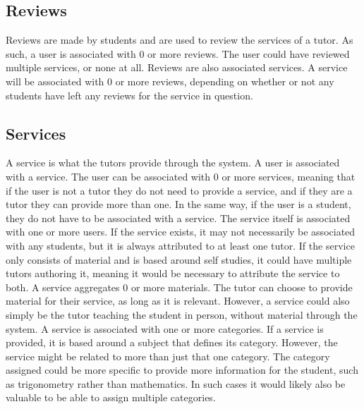 \subsection{Reviews}
Reviews are made by students and are used to review the services of a tutor.
As such, a user is associated with 0 or more reviews.
The user could have reviewed multiple services, or none at all.
Reviews are also associated services.
A service will be associated with 0 or more reviews, depending on whether or not any students have left any reviews for the service in question.

\subsection{Services}
A service is what the tutors provide through the system. 
A user is associated with a service.
The user can be associated with 0 or more services, meaning that if the user is not a tutor they do not need to provide a service, and if they are a tutor they can provide more than one. 
In the same way, if the user is a student, they do not have to be associated with a service.
The service itself is associated with one or more users.
If the service exists, it may not necessarily be associated with any students, but it is always attributed to at least one tutor.
If the service only consists of material and is based around self studies, it could have multiple tutors authoring it, meaning it would be necessary to attribute the service to both.
A service aggregates 0 or more materials. 
The tutor can choose to provide material for their service, as long as it is relevant. 
However, a service could also simply be the tutor teaching the student in person, without material through the system.
A service is associated with one or more categories.
If a service is provided, it is based around a subject that defines its category.
However, the service might be related to more than just that one category.
The category assigned could be more specific to provide more information for the student, such as trigonometry rather than mathematics.
In such cases it would likely also be valuable to be able to assign multiple categories.
